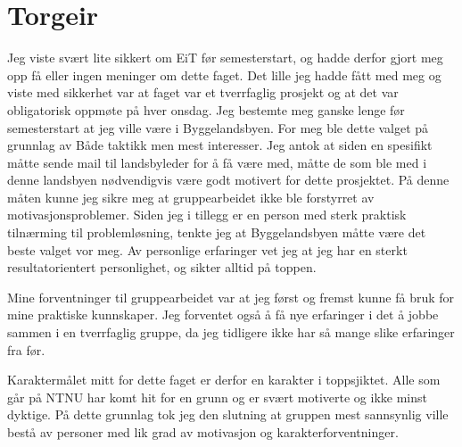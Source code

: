 \section{Torgeir}
Jeg viste svært lite sikkert om EiT før semesterstart, og hadde derfor gjort meg opp få eller ingen meninger om dette faget. Det lille jeg hadde fått med meg og viste med sikkerhet var at faget var et tverrfaglig prosjekt og at det var obligatorisk oppmøte på hver onsdag. Jeg bestemte meg ganske lenge før semesterstart at jeg ville være i Byggelandsbyen. For meg ble dette valget på grunnlag av Både taktikk men mest interesser. Jeg antok at siden en spesifikt måtte sende mail til landsbyleder for å få være med, måtte de som ble med i denne landsbyen nødvendigvis være godt motivert for dette prosjektet. På denne måten kunne jeg sikre meg at gruppearbeidet ikke ble forstyrret av motivasjonsproblemer. Siden jeg i tillegg er en person med sterk praktisk tilnærming til problemløsning, tenkte jeg at Byggelandsbyen måtte være det beste valget vor meg. Av personlige erfaringer vet jeg at jeg har en sterkt resultatorientert personlighet, og sikter alltid på toppen. 

Mine forventninger til gruppearbeidet var at jeg først og fremst kunne få bruk for mine praktiske kunnskaper. Jeg forventet også å få nye erfaringer i det å jobbe sammen i en tverrfaglig gruppe, da jeg tidligere ikke har så mange slike erfaringer fra før.   

Karaktermålet mitt for dette faget er derfor en karakter i toppsjiktet. Alle som går på NTNU har komt hit for en grunn og er svært motiverte og ikke minst dyktige. På dette grunnlag tok jeg den slutning at gruppen mest sannsynlig ville bestå av personer med lik grad av motivasjon og karakterforventninger.     
